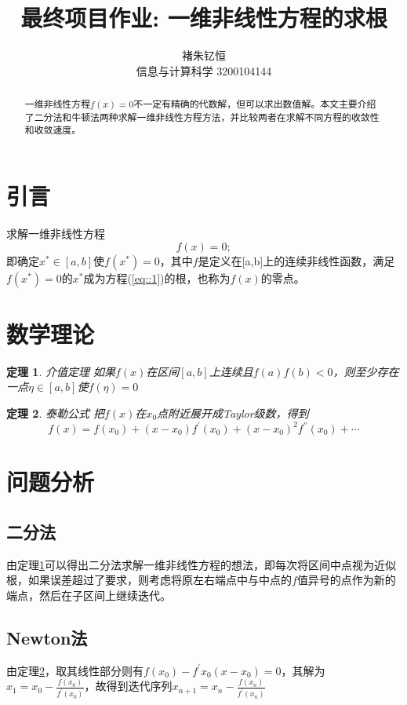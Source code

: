 \documentclass{article}
\title{最终项目作业: 一维非线性方程的求根}
\author{褚朱钇恒 \\ 信息与计算科学 3200104144}
\newtheorem{theorem}{定理}
\begin{document}
\maketitle
\begin{abstract}
     一维非线性方程$f(x)=0$不一定有精确的代数解，但可以求出数值解。本文主要介绍了二分法和牛顿法两种求解一维非线性方程方法，并比较两者在求解不同方程的收敛性和收敛速度。
     
\end{abstract}
\section{引言}
     求解一维非线性方程
     \begin{equation}
          f(x)=0;
          \label{eq::1}
     \end{equation}
     即确定$x^*\in[a,b]$使$f(x^*)=0$，其中$f$是定义在[a,b]上的连续非线性函数，满足$f(x^*)=0$的$x^*$成为方程(\ref{eq::1})的根，也称为$f(x)$的零点。
\section{数学理论}
     \begin{theorem}{介值定理}
          \label{the::intermediate}
          如果$f(x)$在区间$[a,b]$上连续且$f(a)f(b)<0$，则至少存在一点$\eta\in[a,b]$使$f(\eta)=0$

     \end{theorem}
     \begin{theorem}{泰勒公式}
          \label{the::taylor}
          把$f(x)$在$x_0$点附近展开成Taylor级数，得到
          $$f(x)=f(x_0)+(x-x_0)f^{'}(x_0)+(x-x_0)^2f^{''}(x_0)+\cdots$$
     \end{theorem}
\section{问题分析}
     \subsection{二分法}
     由定理\ref{the::intermediate}可以得出二分法求解一维非线性方程的想法，即每次将区间中点视为近似根，如果误差超过了要求，则考虑将原左右端点中与中点的$f$值异号的点作为新的端点，然后在子区间上继续迭代。

     \subsection{Newton法}
     由定理\ref{the::taylor}，取其线性部分则有$f(x_0)-f^{'}{x_0}(x-x_0)=0$，其解为$x_1=x_0-\frac{f(x_0)}{f^{'}(x_0)}$，故得到迭代序列$x_{n+1}=x_n-\frac{f(x_n)}{f^{'}(x_n)}$
     
\end{document}
